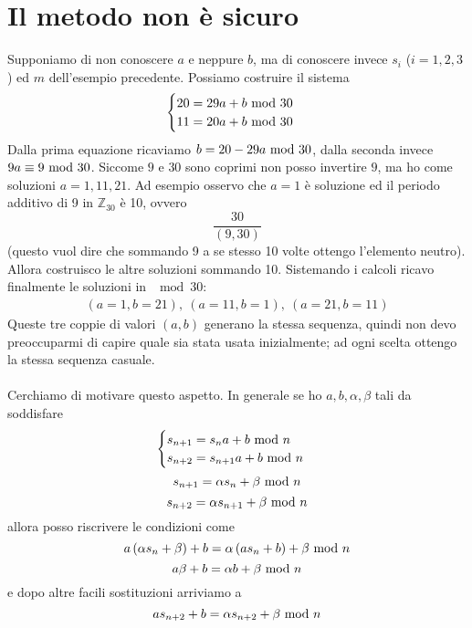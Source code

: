 \section{Il metodo non è sicuro}

	Supponiamo di non conoscere $a$ e neppure $b$, ma di conoscere invece $s_i$ ($i=1,2,3$) ed $m$ dell'esempio precedente. Possiamo costruire il sistema
	\begin{equation*}
	\begin{cases}
	20 =29a+b\ \mathrm{mod}\ 30\\
	11=20a+b\ \mathrm{mod}\ 30
	\end{cases}
	\end{equation*}
	Dalla prima equazione ricaviamo $b=20-29a\ \mathrm{mod}\ 30$, dalla seconda invece $9a\equiv9\ \mathrm{mod}\ 30$. Siccome $9$ e $30$ sono coprimi non posso invertire $9$, ma ho come soluzioni $a=1,11,21$. Ad esempio osservo che $a=1$ è soluzione ed il periodo additivo di 9 in $\mathbb{Z}_{30}$ è 10, ovvero 
	\begin{equation*}
	\frac{30}{(9,30)}
	\end{equation*}
	(questo vuol dire che sommando 9 a se stesso 10 volte ottengo l'elemento neutro). Allora costruisco le altre soluzioni sommando 10. Sistemando i calcoli ricavo finalmente le soluzioni in $\mod30$:
	\begin{align*}
	(a=1,b=21), \ (a=11, b=1), \ (a=21, b=11)
	\end{align*}
	Queste tre coppie di valori $(a,b)$ generano la stessa sequenza, quindi non devo preoccuparmi di capire quale sia stata usata inizialmente; ad ogni scelta ottengo la stessa sequenza casuale. \\ \\ Cerchiamo di motivare questo aspetto. In generale se ho $a,b,\alpha,\beta$ tali da soddisfare
	\begin{equation*}
	\begin{cases}
	s_{n+1} =s_na+b\ \mathrm{mod}\ n\\
	s_{n+2}=s_{n+1}a+b\ \mathrm{mod}\ n
	\end{cases}
	\end{equation*}
	\begin{equation*}
	s_{n+1}=\alpha s_n+\beta \ \mathrm{mod}\ n
	\end{equation*}
	\begin{equation*}
	s_{n+2}=\alpha s_{n+1}+\beta \ \mathrm{mod}\ n
	\end{equation*}
	allora posso riscrivere le condizioni come
	\begin{equation*}
	a\left(\alpha s_n+\beta\right)+b=\alpha\left(as_n+b\right)+\beta \ \mathrm{mod}\ n
	\end{equation*}
	\begin{equation*}
	a\beta+b=\alpha b+\beta\ \mathrm{mod}\ n
	\end{equation*}
	e dopo altre facili sostituzioni arriviamo a 
	\begin{equation*}
	as_{n+2}+b=\alpha s_{n+2}+\beta \ \mathrm{mod}\ n
	\end{equation*}
	
